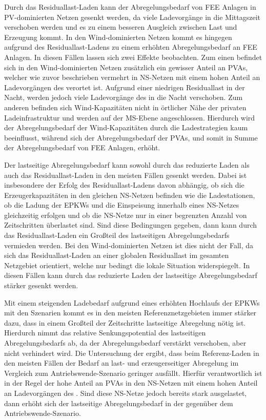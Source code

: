 Durch das Residuallast-Laden kann der Abregelungsbedarf von \gls{FEE} Anlagen in \gls{PV}-dominierten Netzen gesenkt werden, da viele Ladevorgänge in die Mittagszeit verschoben werden und es zu einem besseren Ausgleich zwischen Last und Erzeugung kommt.
In den Wind-dominierten Netzen kommt es hingegen aufgrund des Residuallast-Ladens zu einem erhöhten Abregelungsbedarf an \gls{FEE} Anlagen.
In diesen Fällen lassen sich zwei Effekte beobachten.
Zum einen befindet sich in den Wind-dominierten Netzen zusätzlich ein gewisser Anteil an \glspl{PVA}, welcher wie zuvor beschrieben vermehrt in \gls{NS}-Netzen mit einem hohen Anteil an Ladevorgängen des \UC \zH verortet ist.
Aufgrund einer niedrigen Residuallast in der Nacht, werden jedoch viele Ladevorgänge des \UC \zH in die Nacht verschoben.
Zum anderen befinden sich Wind-Kapazitäten nicht in örtlicher Nähe der privaten Ladeinfrastruktur und werden auf der \gls{MS}-Ebene angeschlossen.
Hierdurch wird der Abregelungsbedarf der Wind-Kapazitäten durch die Ladestrategien kaum beeinflusst, während sich der Abregelungsbedarf der \glspl{PVA}, und somit in Summe der Abregelungsbedarf von \gls{FEE} Anlagen, erhöht.\medskip

Der lastseitige Abregelungsbedarf kann sowohl durch das reduzierte Laden als auch das Residuallast-Laden in den meisten Fällen gesenkt werden.
Dabei ist insbesondere der Erfolg des Residuallast-Ladens davon abhängig, ob sich die Erzeugerkapazitäten in den gleichen \gls{NS}-Netzen befinden wie die Ladestationen, ob die Ladung der \glspl{EPKW} und die Einspeisung innerhalb eines \gls{NS}-Netzes gleichzeitig erfolgen und ob die \gls{NS}-Netze nur in einer begrenzten Anzahl von Zeitschritten überlastet sind.
Sind diese Bedingungen gegeben, dann kann durch das Residuallast-Laden ein Großteil des lastseitigen Abregelungsbedarfs vermieden werden.
Bei den Wind-dominierten Netzen ist dies nicht der Fall, da sich das Residuallast-Laden an einer globalen Residuallast im gesamten Netzgebiet orientiert, welche nur bedingt die lokale Situation widerspiegelt.
In diesen Fällen kann durch das reduzierte Laden der lastseitige Abregelungsbedarf stärker gesenkt werden.\medskip

Mit einem steigenden Ladebedarf aufgrund eines erhöhten Hochlaufs der \glspl{EPKW} mit den Szenarien kommt es in den meisten Referenznetzgebieten immer stärker dazu, dass in einem Großteil der Zeitschritte lastseitige Abregelung nötig ist.
Hierdurch nimmt das relative Senkungspotential des lastseitigen Abregelungsbedarfs ab, da der Abregelungsbedarf verstärkt verschoben, aber nicht verhindert wird.
Die Untersuchung der \SzeFirmenparkplatz ergibt, dass beim Referenz-Laden in den meisten Fällen der Bedarf an last- und erzeugerseitiger Abregelung im Vergleich zum Antriebswende-Szenario geringer ausfällt.
Hierfür verantwortlich ist in der Regel der hohe Anteil an \glspl{PVA} in den \gls{NS}-Netzen mit einem hohen Anteil an Ladevorgängen des \UC \zHdot.
Sind diese \gls{NS}-Netze jedoch bereits stark ausgelastet, dann erhöht sich der lastseitige Abregelungsbedarf in der \SzeFirmenparkplatz gegenüber dem Antriebswende-Szenario.\medskip

